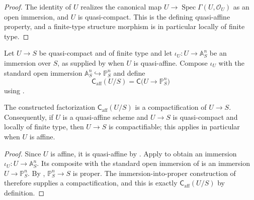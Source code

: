\begin{proof}
  \leanok
  The identity of $U$ realizes the canonical map
  $U\to\operatorname{Spec}\Gamma(U,\mathcal O_U)$ as an open immersion, and
  $U$ is quasi-compact.  This is the defining quasi-affine property, and a
  finite-type structure morphism is in particular locally of finite type.
\end{proof}

\begin{definition}
  \label{def:nagata-affine-compactification}
  \leanok

  Let $U\to S$ be quasi-compact and of finite type and let
  $\iota_U\colon U\to\mathbb A^n_S$ be an immersion over $S$, as supplied by
   when $U$ is
  quasi-affine.  Compose $\iota_U$ with the standard open immersion
  $\mathbb A^n_S\hookrightarrow\mathbb P^n_S$ and define
  \[
    \mathsf C_{\mathrm{aff}}(U/S)
      =\mathsf C\bigl(U\longrightarrow\mathbb P^n_S\bigr)
  \]
  using .
\end{definition}

\begin{proposition}
  \label{prop:nagata-affine-compactification}
  \leanok

  The constructed factorization $\mathsf C_{\mathrm{aff}}(U/S)$ is a
  compactification of $U\to S$.  Consequently, if $U$ is a quasi-affine
  scheme and $U\to S$ is quasi-compact and locally of finite type, then
  $U\to S$ is compactifiable; this applies in particular when $U$ is affine.
\end{proposition}

\begin{proof}
  \leanok
  Since $U$ is affine, it is quasi-affine by
  .  Apply
   to obtain an
  immersion $\iota_U\colon U\to\mathbb A^n_S$.  Its composite with the
  standard open immersion of
   is an immersion
  $U\to\mathbb P^n_S$.  By
  , $\mathbb P^n_S\to S$ is proper.
  The immersion-into-proper construction of
   therefore supplies a
  compactification, and this is exactly
  $\mathsf C_{\mathrm{aff}}(U/S)$ by definition.
\end{proof}

